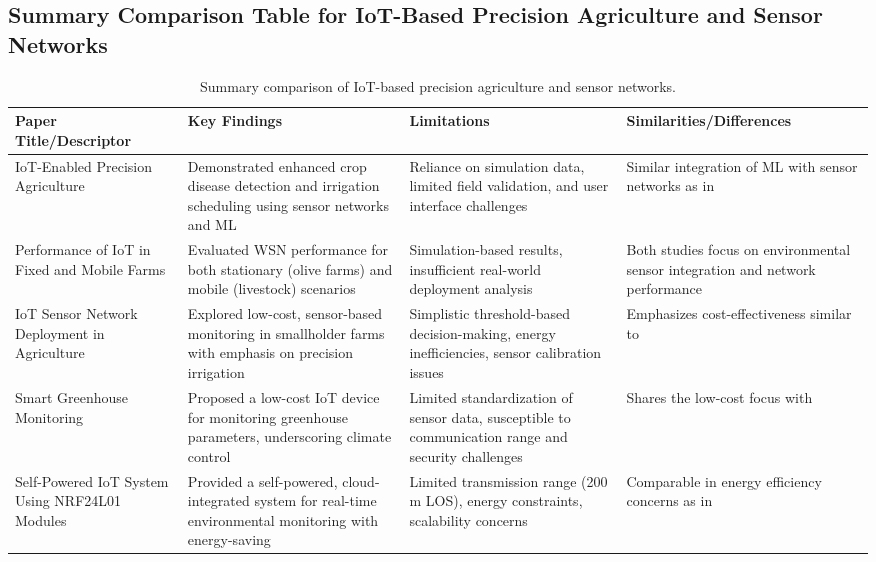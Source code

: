 \documentclass[12pt,onecolumn]{IEEEtran} %
\begin{document}
\subsection{Summary Comparison Table for IoT-Based Precision Agriculture and Sensor Networks}
\begin{table}[h]
\centering
\begin{tabularx}{\textwidth}{|l|X|X|X|}
\hline
\textbf{Paper Title/Descriptor} & \textbf{Key Findings} & \textbf{Limitations} & \textbf{Similarities/Differences} \\
\hline
IoT-Enabled Precision Agriculture \cite{akhter2022precisionagricultureusing} & Demonstrated enhanced crop disease detection and irrigation scheduling using sensor networks and ML & Reliance on simulation data, limited field validation, and user interface challenges & Similar integration of ML with sensor networks as in \cite{bakthavatchalam2022iotframeworkfor} \\
\hline
Performance of IoT in Fixed and Mobile Farms \cite{atalla2023iotenabledprecisionagriculture} & Evaluated WSN performance for both stationary (olive farms) and mobile (livestock) scenarios & Simulation-based results, insufficient real-world deployment analysis & Both studies focus on environmental sensor integration and network performance \\
\hline
IoT Sensor Network Deployment in Agriculture \cite{bayih2022utilizationofinternet} & Explored low-cost, sensor-based monitoring in smallholder farms with emphasis on precision irrigation & Simplistic threshold-based decision-making, energy inefficiencies, sensor calibration issues & Emphasizes cost-effectiveness similar to \cite{abunadi2022trafficawaresecuredcooperative} \\
\hline
Smart Greenhouse Monitoring \cite{simo2022smartagricultureiotbased} & Proposed a low-cost IoT device for monitoring greenhouse parameters, underscoring climate control & Limited standardization of sensor data, susceptible to communication range and security challenges & Shares the low-cost focus with \cite{bayih2022utilizationofinternet} \\
\hline
Self-Powered IoT System Using NRF24L01 Modules \cite{raju2022aselfpoweredrealtime} & Provided a self-powered, cloud-integrated system for real-time environmental monitoring with energy-saving & Limited transmission range (200 m LOS), energy constraints, scalability concerns & Comparable in energy efficiency concerns as in \cite{bayih2022utilizationofinternet} \\
\hline
\end{tabularx}
\caption{Summary comparison of IoT-based precision agriculture and sensor networks.}
\label{tab:summary1}
\end{table}
\end{document}
